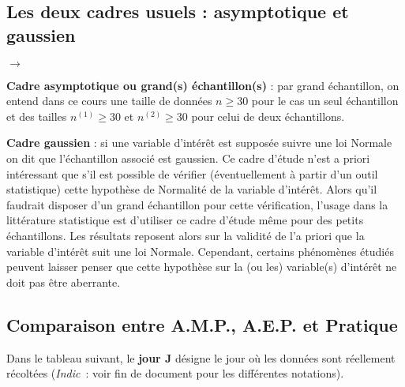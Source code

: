 \documentclass[10pt]{article}
\begin{document}
\subsection{Les deux cadres usuels : asymptotique et gaussien} \label{cadreEstim}
  \begin{list}{$\to$}{}
\item \textbf{Cadre asymptotique ou  grand(s) échantillon(s)} : par grand {\'e}chantillon, on entend dans ce cours une taille de donn{\'e}es $n\geq30$  pour le cas un seul {\'e}chantillon et  des tailles $n^{(1)}\geq30$ et $n^{(2)}\geq30$ pour celui de deux {\'e}chantillons. 
\item \textbf{Cadre gaussien} : si une variable d'int{\'e}r{\^e}t est suppos{\'e}e suivre une loi Normale on dit que l'{\'e}chantillon associ{\'e} est gaussien.
Ce cadre d'{\'e}tude n'est a priori int{\'e}ressant que s'il est possible de v{\'e}rifier ({\'e}ventuellement {\`a} partir d'un outil statistique) cette hypoth{\`e}se de Normalit{\'e} de la variable d'int{\'e}r{\^e}t. Alors qu'il faudrait disposer d'un grand {\'e}chantillon pour cette v{\'e}rification, l'usage dans la litt{\'e}rature statistique est d'utiliser ce cadre d'{\'e}tude m{\^e}me pour des petits {\'e}chantillons. Les r{\'e}sultats reposent alors sur la validit{\'e} de l'a priori que la variable d'int{\'e}r{\^e}t suit une loi Normale. Cependant, certains ph{\'e}nom{\`e}nes {\'e}tudi{\'e}s peuvent laisser penser que cette hypoth{\`e}se sur la (ou les) variable(s) d'int{\'e}r{\^e}t ne doit  pas {\^e}tre aberrante. 
\end{list}

\subsection{Comparaison entre A.M.P., A.E.P. et Pratique }

Dans le tableau suivant, le \textbf{jour J} désigne le jour où les données sont réellement récoltées (\textit{Indic}~: voir fin de document pour les différentes notations).
\end{document}
